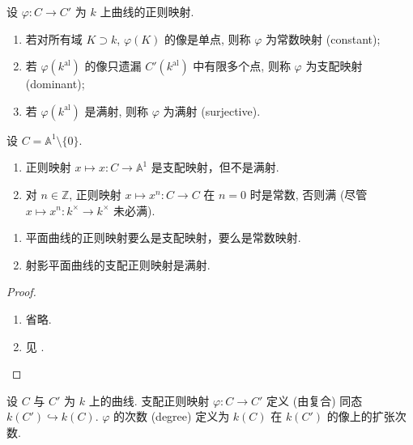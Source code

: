 \begin{definition} \label{thm:1.4.21} 
设 $\varphi\colon C\to C'$ 为 $k$ 上曲线的正则映射.
\begin{enumerate}[label=\textup{(\alph*)}]
\item 若对所有域 $K\supset k$, $\varphi(K)$ 的像是单点, 则称 $\varphi$ 为常数映射 (constant);
\item 若 $\varphi(k^{\mathrm{al}})$ 的像只遗漏 $C'(k^{\mathrm{al}})$ 中有限多个点, 则称 $\varphi$ 为支配映射 (dominant);
\item 若 $\varphi(k^{\mathrm{al}})$ 是满射, 则称 $\varphi$ 为满射 (surjective).
\end{enumerate}
\end{definition}

\begin{example} \label{thm:1.4.22} 
设 $C = \mathbb{A}^1\setminus\{0\}$.
\begin{enumerate}[label=\textup{(\alph*)}]
\item 正则映射 $x\mapsto x\colon C\to\mathbb{A}^1$ 是支配映射，但不是满射.
\item 对 $n\in\mathbb{Z}$, 正则映射 $x\mapsto x^n\colon C\to C$ 在 $n = 0$ 时是常数, 否则满 (尽管 $x\mapsto x^n\colon k^{\times}\to k^{\times}$ 未必满).
\end{enumerate}
\end{example}

\begin{proposition} \label{thm:1.4.23} 
\begin{enumerate}[label=\textup{(\alph*)}]
\item 平面曲线的正则映射要么是支配映射，要么是常数映射.
\item 射影平面曲线的支配正则映射是满射.
\end{enumerate}
\end{proposition}

\begin{proof}
\begin{enumerate}[label=\textup{(\alph*)}]
\item 省略.
\item 见 \cite[\S8.3, Problem 8-18]{fulton1969}.
\end{enumerate}
\end{proof}

设 $C$ 与 $C'$ 为 $k$ 上的曲线. 支配正则映射 $\varphi\colon C\to C'$ 定义 (由复合) 同态 $k(C')\hookrightarrow k(C)$. $\varphi$ 的次数 (degree) 定义为 $k(C)$ 在 $k(C')$ 的像上的扩张次数.

